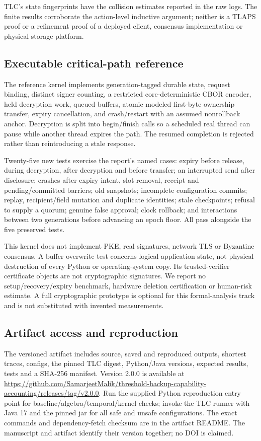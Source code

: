 \documentclass[pdflatex,sn-mathphys-num]{sn-jnl}
\theoremstyle{plain}
\theoremstyle{definition}
\begin{document}
TLC's state fingerprints have the collision estimates reported in the raw logs. The finite results corroborate the action-level inductive argument; neither is a TLAPS proof or a refinement proof of a deployed client, consensus implementation or physical storage platform.

\subsection{Executable critical-path reference}
The reference kernel implements generation-tagged durable state, request binding, distinct signer counting, a restricted core-deterministic CBOR encoder, held decryption work, queued buffers, atomic modeled first-byte ownership transfer, expiry cancellation, and crash/restart with an assumed nonrollback anchor. Decryption is split into begin/finish calls so a scheduled real thread can pause while another thread expires the path. The resumed completion is rejected rather than reintroducing a stale response.

Twenty-five new tests exercise the report's named cases: expiry before release, during decryption, after decryption and before transfer; an interrupted send after disclosure; crashes after expiry intent, slot removal, receipt and pending/committed barriers; old snapshots; incomplete configuration commits; replay, recipient/field mutation and duplicate identities; stale checkpoints; refusal to supply a quorum; genuine false approval; clock rollback; and interactions between two generations before advancing an epoch floor. All pass alongside the five preserved tests.

This kernel does not implement PKE, real signatures, network TLS or Byzantine consensus. A buffer-overwrite test concerns logical application state, not physical destruction of every Python or operating-system copy. Its trusted-verifier certificate objects are not cryptographic signatures. We report no setup/recovery/expiry benchmark, hardware deletion certification or human-risk estimate. A full cryptographic prototype is optional for this formal-analysis track and is not substituted with invented measurements.

\subsection{Artifact access and reproduction}\label{sec:artifact}
The versioned artifact includes source, saved and reproduced outputs, shortest traces, configs, the pinned TLC digest, Python/Java versions, expected results, tests and a SHA-256 manifest. Version 2.0.0 is available at \url{https://github.com/SamarjeetMalik/threshold-backup-capability-accounting/releases/tag/v2.0.0}. Run the supplied Python reproduction entry point for baseline/algebra/temporal/kernel checks; invoke the TLC runner with Java 17 and the pinned jar for all safe and unsafe configurations. The exact commands and dependency-fetch checksum are in the artifact README. The manuscript and artifact identify their version together; no DOI is claimed.
\end{document}
